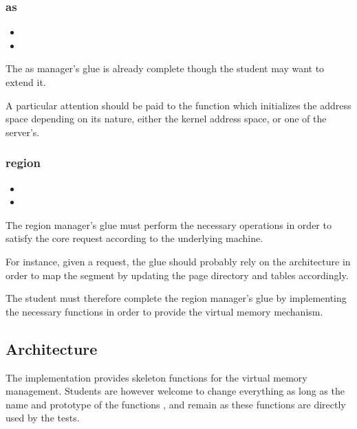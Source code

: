 \subsubsection*{as}

\begin{itemize}
  \item
  \item
\end{itemize}

The as manager's glue is already complete though the student may want to extend
it.

A particular attention should be paid to the 
function which initializes the address space depending on its nature,
either the kernel address space, or one of the server's.

\subsubsection*{region}

\begin{itemize}
  \item
  \item
\end{itemize}

The region manager's glue must perform the necessary operations in order to
satisfy the core request according to the underlying machine.

For instance, given a  request, the glue should
probably rely on the architecture in order to map the segment by updating
the page directory and tables accordingly.

The student must therefore complete the region manager's glue by implementing
the necessary functions in order to provide the virtual memory mechanism.

\subsection{Architecture}

The  implementation provides skeleton functions for
the virtual memory management. Students are however welcome to change
everything as long as the name and prototype of the functions
,  and
 remain as these functions are directly
used by the tests.


